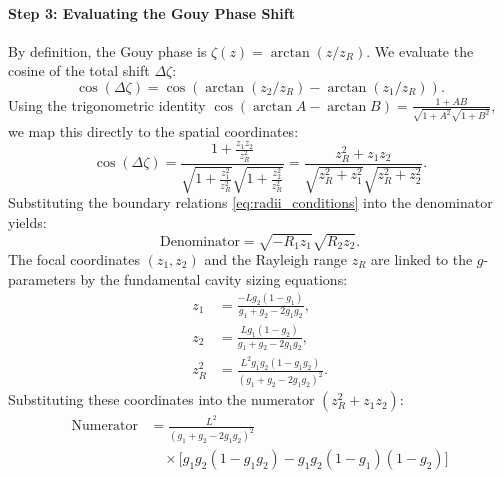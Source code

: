\begin{resolucao}[Solution]
        \paragraph*{Step 3: Evaluating the Gouy Phase Shift}
            By definition, the Gouy phase is $\zeta(z) = \arctan(z/z_R)$. We evaluate the cosine of the total shift $\Delta\zeta$:
            \begin{equation}
                \cos(\Delta\zeta) = \cos(\arctan(z_2/z_R) - \arctan(z_1/z_R)).
            \end{equation}
            Using the trigonometric identity $\cos(\arctan A - \arctan B) = \frac{1 + AB}{\sqrt{1+A^2}\sqrt{1+B^2}}$, we map this directly to the spatial coordinates:
            \begin{equation}
                \cos(\Delta\zeta) = \frac{1 + \frac{z_1 z_2}{z_R^2}}{\sqrt{1 + \frac{z_1^2}{z_R^2}}\sqrt{1 + \frac{z_2^2}{z_R^2}}} = \frac{z_R^2 + z_1 z_2}{\sqrt{z_R^2 + z_1^2}\sqrt{z_R^2 + z_2^2}}.
                \label{eq:cos_delta_zeta}
            \end{equation}
            Substituting the boundary relations \eqref{eq:radii_conditions} into the denominator yields:
            \begin{equation}
                \text{Denominator} = \sqrt{-R_1 z_1} \sqrt{R_2 z_2}.
            \end{equation}
            The focal coordinates $(z_1, z_2)$ and the Rayleigh range $z_R$ are linked to the $g$-parameters by the fundamental cavity sizing equations:
            \begin{equation}
                \begin{aligned}
                    z_1 &= \frac{-L g_2(1-g_1)}
                                 {g_1+g_2-2g_1g_2},
                    \\
                    z_2 &= \frac{L g_1(1-g_2)}
                                 {g_1+g_2-2g_1g_2},
                    \\
                    z_R^2 &= \frac{L^2 g_1 g_2(1-g_1g_2)}
                                   {(g_1+g_2-2g_1g_2)^2}.
                \end{aligned}
            \end{equation}
            Substituting these coordinates into the numerator $(z_R^2 + z_1 z_2)$:
            \begin{align*}
                \text{Numerator} &= \frac{L^2}{(g_1+g_2-2g_1g_2)^2} \\
                & \quad \times \Big[ g_1g_2(1-g_1g_2) - g_1g_2(1-g_1)(1-g_2) \Big] \\

\end{align*}
\end{resolucao}
